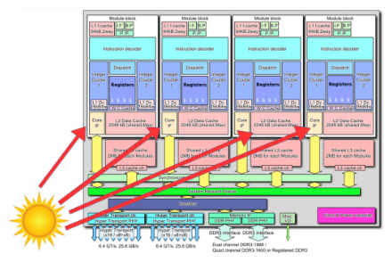 \documentclass[xcolor=pdftex,dvipsnames,table]{beamer}
\begin{document}
\begin{frame}
{\begin{figure}[H]
\begin{center}
        		\includegraphics[scale=0.275]{Processor_Complexity-3.png}
    		\end{center}
   		\end{figure}
    }
\end{frame}
\end{document}
